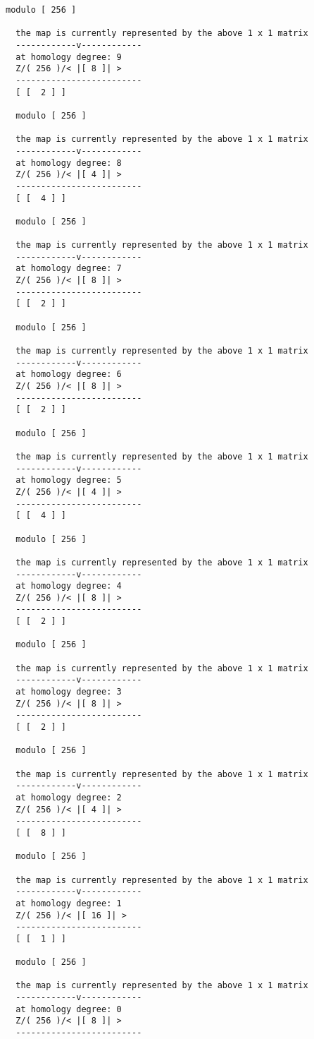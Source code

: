\documentclass[a4paper,11pt]{report}
\begin{document}
{{{\begin{Verbatim}[fontsize=\small,frame=single,label=Example]
  modulo [ 256 ]
  
  the map is currently represented by the above 1 x 1 matrix
  ------------v------------
  at homology degree: 9
  Z/( 256 )/< |[ 8 ]| > 
  -------------------------
  [ [  2 ] ]
  
  modulo [ 256 ]
  
  the map is currently represented by the above 1 x 1 matrix
  ------------v------------
  at homology degree: 8
  Z/( 256 )/< |[ 4 ]| > 
  -------------------------
  [ [  4 ] ]
  
  modulo [ 256 ]
  
  the map is currently represented by the above 1 x 1 matrix
  ------------v------------
  at homology degree: 7
  Z/( 256 )/< |[ 8 ]| > 
  -------------------------
  [ [  2 ] ]
  
  modulo [ 256 ]
  
  the map is currently represented by the above 1 x 1 matrix
  ------------v------------
  at homology degree: 6
  Z/( 256 )/< |[ 8 ]| > 
  -------------------------
  [ [  2 ] ]
  
  modulo [ 256 ]
  
  the map is currently represented by the above 1 x 1 matrix
  ------------v------------
  at homology degree: 5
  Z/( 256 )/< |[ 4 ]| > 
  -------------------------
  [ [  4 ] ]
  
  modulo [ 256 ]
  
  the map is currently represented by the above 1 x 1 matrix
  ------------v------------
  at homology degree: 4
  Z/( 256 )/< |[ 8 ]| > 
  -------------------------
  [ [  2 ] ]
  
  modulo [ 256 ]
  
  the map is currently represented by the above 1 x 1 matrix
  ------------v------------
  at homology degree: 3
  Z/( 256 )/< |[ 8 ]| > 
  -------------------------
  [ [  2 ] ]
  
  modulo [ 256 ]
  
  the map is currently represented by the above 1 x 1 matrix
  ------------v------------
  at homology degree: 2
  Z/( 256 )/< |[ 4 ]| > 
  -------------------------
  [ [  8 ] ]
  
  modulo [ 256 ]
  
  the map is currently represented by the above 1 x 1 matrix
  ------------v------------
  at homology degree: 1
  Z/( 256 )/< |[ 16 ]| > 
  -------------------------
  [ [  1 ] ]
  
  modulo [ 256 ]
  
  the map is currently represented by the above 1 x 1 matrix
  ------------v------------
  at homology degree: 0
  Z/( 256 )/< |[ 8 ]| > 
  -------------------------
\end{Verbatim}
 }

}}
\end{document}

